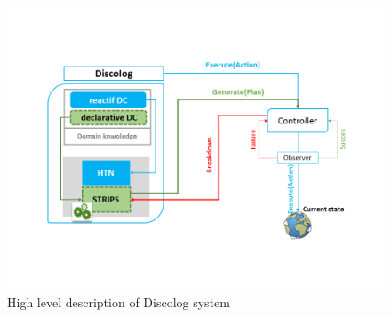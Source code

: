 	\begin{figure}
		\begin{center}
			\includegraphics[width=.5\columnwidth]{Pictures/architecture.PNG}
		\end{center}
		\label{fig:archi}
		\caption{High level description of Discolog system}
	\end{figure}